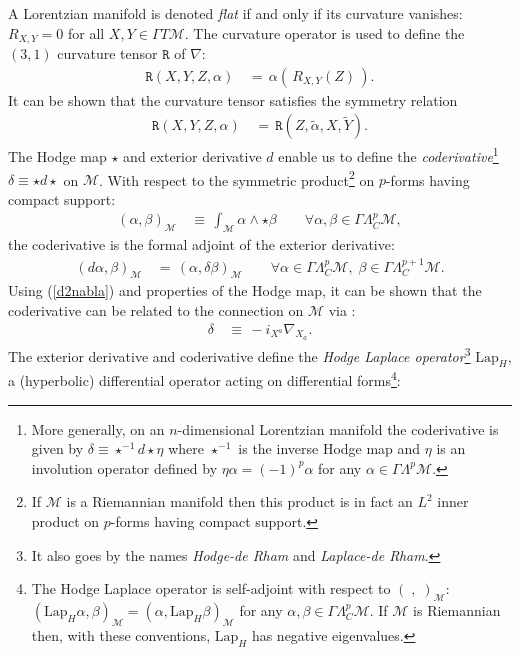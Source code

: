 \documentclass[10pt,a4paper]{article}
\newcommand{\M}{\mathcal{M}}
\newcommand\w{\wedge}
\newcommand\wt[1]{\widetilde{#1}}
\newcommand{\LapH}{\text{Lap}_{H}}
\begin{document}
A Lorentzian manifold is denoted {\it flat} if and only if its curvature vanishes: $R_{X,Y}=0$ for all $X,Y\in\Gamma T\M$. The curvature operator is used to define the $(3,1)$ curvature tensor $\texttt{R}$ of $\nabla$:
\begin{align}\label{CurvT}
	\texttt{R}(X,Y,Z,\alpha) &\,=\, \alpha( \,R_{X,Y}(Z)\, ).
\end{align}
It can be shown that the curvature tensor satisfies the symmetry relation \cite{Spivak}
\begin{align}\label{CurvT_SYM}
	\texttt{R}(X,Y,Z,\alpha) &\,=\, \texttt{R}(Z,\wt{\alpha},X,\wt{Y}).
\end{align}
The Hodge map $\star$ and exterior derivative $d$ enable us to define the {\it coderivative}\footnote{More generally, on an $n$-dimensional Lorentzian manifold the coderivative is given by $\delta \equiv \star^{-1}d\star \eta$ where $\star^{-1}$ is the inverse Hodge map and $\eta$ is an involution operator defined by $\eta\alpha=(-1)^{p}\alpha$ for any $\alpha\in\Gamma\Lambda^{p}\M$.} $\delta \equiv \star d \star$ on $\M$. With respect to the symmetric product\footnote{If $\M$ is a Riemannian manifold then this product is in fact an $L^{2}$ inner product on $p$-forms having compact support.} on $p$-forms having compact support:
\begin{align*}
	(\alpha,\beta)_{\M} &\,\equiv\, \int_{\M} \alpha \w \star \beta \qquad\forall\alpha,\beta\in\Gamma\Lambda^{p}_{C}\M,
\end{align*}
the coderivative is the formal adjoint of the exterior derivative: 
\begin{align*}
	(d\alpha, \beta)_{\M} &\,=\, (\alpha,\delta\beta)_{\M} \qquad\forall \alpha\in\Gamma\Lambda^{p}_{C}\M,\; \beta\in\Gamma\Lambda^{p+1}_{C}\M.
\end{align*}
Using (\ref{d2nabla}) and properties of the Hodge map, it can be shown that the coderivative can be related to the connection on $\M$ via \cite{BennTucker}:
\begin{align}\label{del2nabla}
	\delta &\,\equiv\, -i_{X^{a}}\nabla_{X_{a}}.
\end{align}
The exterior derivative and coderivative define the {\it Hodge Laplace operator}\footnote{It also goes by the names {\it Hodge-de Rham} and {\it Laplace-de Rham}. } $\LapH$, a (hyperbolic) differential operator acting on differential forms\footnote{The Hodge Laplace operator is self-adjoint with respect to $(\;,\;)_{\M}$: $(\LapH\alpha,\beta)_{\M}=(\alpha,\LapH\beta)_{\M}$ for any $\alpha,\beta\in\Gamma\Lambda^{p}_{C}\M$. If $\M$ is Riemannian then, with these conventions, $\LapH$ has negative eigenvalues.}:
\end{document}
